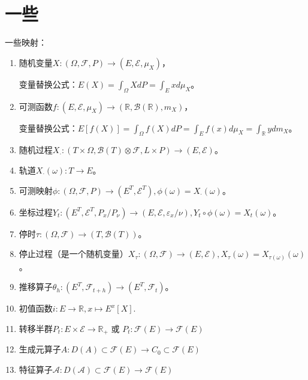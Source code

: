 \begin{comment}
\section{随机控制方面的应用}

随机问题化成确定性问题。

Omitted.

\end{comment}

\newpage

\section{一些}

一些映射：
\begin{enumerate}[(1).]
  \item 随机变量$X: (\Omega, \mathcal{F}, P) \to (E, \mathcal{E}, \mu_{X})$，
  
  变量替换公式：$E(X) = \int_\Omega X dP = \int_E x d\mu_X$。
  \item 可测函数$f: (E, \mathcal{E}, \mu_X) \to (\mathbb{R}, \mathcal{B}(\mathbb{R}), m_X)$，
  
  变量替换公式：$E[f(X)] = \int_\Omega f(X)dP = \int_E f(x) d\mu_X = \int_\mathbb{R} y dm_X$。
  \item 随机过程$X_{\cdot}: (T \times \Omega, \mathcal{B}(T) \otimes \mathcal{F}, L \times P) \to (E, \mathcal{E})$。
  \item 轨道$X_{\cdot}(\omega): T \to E$。
  \item 可测映射$\phi: (\Omega, \mathcal{F}, P) \to (E^T, \mathcal{E}^T), \phi(\omega) = X_{\cdot}(\omega)$。
  \item 坐标过程$Y_t: (E^T, \mathcal{E}^T, P_x/P_\nu) \to (E, \mathcal{E}, \varepsilon_x/\nu), Y_t \circ \phi (\omega) = X_t(\omega)$。
  \item 停时$\tau: (\Omega, \mathcal{F}) \to (T, \mathcal{B}(T))$。
  \item 停止过程（是一个随机变量）$X_\tau: (\Omega, \mathcal{F}) \to (E, \mathcal{E}), X_\tau (\omega) = X_{\tau(\omega)}(\omega)$。
  \item 推移算子$\theta_h: (E^T, \mathcal{F}_{t + h}) \to (E^T, \mathcal{F}_t)$。
  \item 初值函数$i: E \to \mathbb{R}, x \mapsto E^x[X]$.
  \item 转移半群$P_t: E \times \mathcal{E} \to \mathbb{R}_+$ 或 $P_t: \mathcal{F}(E) \to \mathcal{F}(E)$
  \item 生成元算子$A: D(A) \subset \mathcal{F}(E) \to C_0 \subset \mathcal{F}(E)$
  \item 特征算子$\mathcal{A}: D(\mathcal{A}) \subset \mathcal{F}(E) \to \mathcal{F}(E)$
\end{enumerate}

